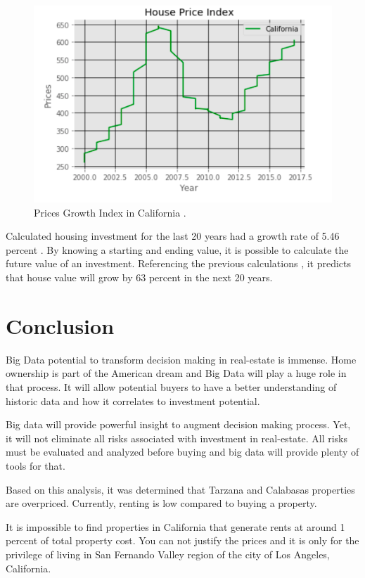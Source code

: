 \documentclass[sigconf]{acmart}
\begin{document}
\begin{figure}
  \centering
  \includegraphics[width=1.0\columnwidth]{images/figure14.png}
  \caption{Prices Growth Index in California \cite{md}.} \label{fig:figure14} 
\end{figure}

Calculated housing investment for the last 20 years had a growth rate of 5.46 percent \cite{md}. By knowing a starting and ending value, it is possible to calculate the future value of an investment. Referencing the previous calculations \cite{md}, it predicts that house value will grow by 63 percent in the next 20 years.

\section{Conclusion}

Big Data potential to transform decision making in real-estate is immense. Home ownership is part of the American dream and Big Data will play a huge role in that process. It will allow potential buyers to have a better understanding of historic data and how it correlates to investment potential.

Big data will provide powerful insight to augment decision making process. Yet, it will not eliminate all risks associated with investment in real-estate. All risks must be evaluated and analyzed before buying and big data will provide plenty of tools for that.

Based on this analysis, it was determined that Tarzana and Calabasas properties are overpriced. Currently, renting is low compared to buying a property.

It is impossible to find properties in California that generate rents at around 1 percent of total property cost. You can not justify the prices and it is only for the privilege of living in San Fernando Valley region of the city of Los Angeles, California.
\end{document}
